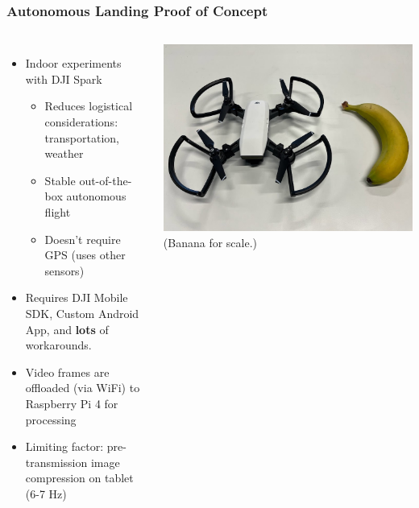 \documentclass[aspectratio=169]{rubeamer}
\newif\ifpause
\newcommand{\mypause}{\ifpause \pause \fi}
\begin{document}
\begin{frame}
  \frametitle{Autonomous Landing Proof of Concept}
  \begin{columns}
      \begin{itemize}
        \item Indoor experiments with DJI Spark
        \mypause
        \begin{itemize}
          \item Reduces logistical considerations:\\transportation, weather
          \mypause
          \item Stable out-of-the-box autonomous flight
          \mypause
          \item Doesn't require GPS (uses other sensors)
        \end{itemize}
        \mypause
        \item Requires DJI Mobile SDK, Custom Android App, and \textbf{lots} of workarounds.
        \mypause
        \item Video frames are offloaded (via WiFi) to Raspberry Pi 4 for processing
        \mypause
        \item Limiting factor: pre-transmission image compression on tablet (6-7 Hz)
      \end{itemize}
    \centering
    \onslide
    \includegraphics[width=\textwidth]{dji_spark}\\(Banana for scale.)
  \end{columns}
\end{frame}
\end{document}
